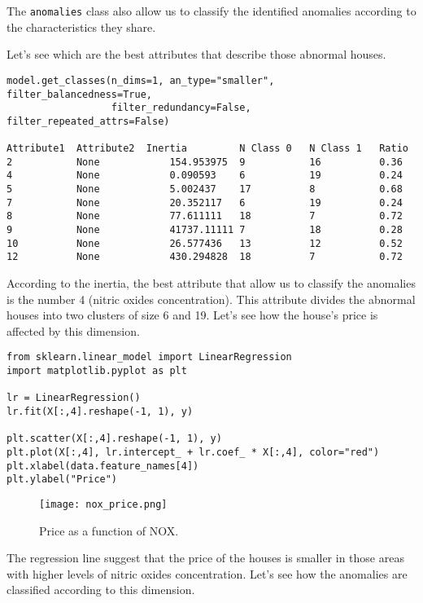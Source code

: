 The \texttt{anomalies} class also allow us to classify the identified anomalies according to the characteristics they share.


Let's see which are the best attributes that describe those abnormal houses.

\begin{sourcecode}
{\scriptsize \begin{verbatim}
model.get_classes(n_dims=1, an_type="smaller", filter_balancedness=True,
                  filter_redundancy=False, filter_repeated_attrs=False)

Attribute1	Attribute2	Inertia	        N Class 0	N Class 1	Ratio
2	        None	        154.953975	9	        16	        0.36
4	        None   	        0.090593	6	        19	        0.24
5	        None	        5.002437	17	        8	        0.68
7	        None	        20.352117	6	        19	        0.24
8	        None	        77.611111	18	        7	        0.72
9	        None	        41737.11111	7	        18	        0.28
10	        None	        26.577436	13	        12	        0.52
12	        None	        430.294828	18	        7	        0.72
\end{verbatim}}
\end{sourcecode}

According to the inertia, the best attribute that allow us to classify the anomalies is the number 4 (nitric oxides concentration). This attribute divides the abnormal houses into two clusters of size 6 and 19. Let's see how the house's price is affected by this dimension.

\begin{sourcecode}
{\scriptsize \begin{verbatim}
from sklearn.linear_model import LinearRegression
import matplotlib.pyplot as plt
        
lr = LinearRegression()
lr.fit(X[:,4].reshape(-1, 1), y)
        
plt.scatter(X[:,4].reshape(-1, 1), y)
plt.plot(X[:,4], lr.intercept_ + lr.coef_ * X[:,4], color="red")
plt.xlabel(data.feature_names[4])
plt.ylabel("Price")
\end{verbatim}}
\end{sourcecode}

\begin{figure}[h]
\centering
\texttt{[image: nox\_price.png]}
\caption{Price as a function of NOX.}
\label{figure:nox_vs_price}
\end{figure}

The regression line suggest that the price of the houses is smaller in those areas with higher levels of nitric oxides concentration. Let's see how the anomalies are classified according to this dimension.

